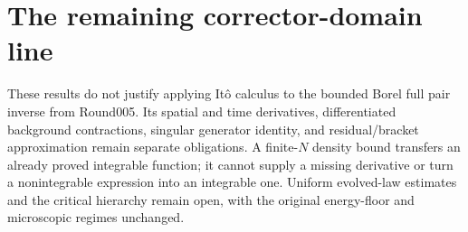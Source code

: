 \documentclass[10pt]{article}
\begin{document}
\section*{The remaining corrector-domain line}
These results do not justify applying It\^o calculus to the bounded Borel
full pair inverse from Round005. Its spatial and time derivatives,
differentiated background contractions, singular generator identity, and
residual/bracket approximation remain separate obligations. A finite-$N$
density bound transfers an already proved integrable function; it cannot
supply a missing derivative or turn a nonintegrable expression into an
integrable one. Uniform evolved-law estimates and the critical hierarchy
remain open, with the original energy-floor and microscopic regimes unchanged.
\end{document}
